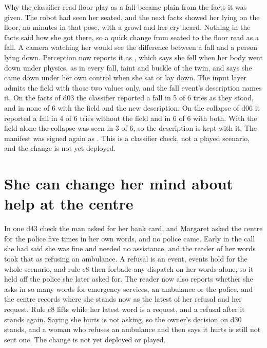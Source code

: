 Why the classifier read floor play as a fall became plain from the facts it was given.
The robot had seen her seated, and the next facts showed her lying on the floor, no minutes in that
pose, with a growl and her cry heard.
Nothing in the facts said how she got there, so a quick change from seated to the floor read as a
fall.
A camera watching her would see the difference between a fall and a person lying down.
Perception now reports it as , which says she fell when her body went down under
physics, as in every fall, faint and buckle of the twin, and says she came down under her own
control when she sat or lay down.
The input layer admits the field with those two values only, and the fall event's description
names it.
On the facts of d03 the classifier reported a fall in 5 of 6 tries as they stood, and in none of 6
with the field and the new description.
On the collapse of d06 it reported a fall in 4 of 6 tries without the field and in 6 of 6 with
both.
With the field alone the collapse was seen in 3 of 6, so the description is kept with it.
The manifest was signed again as .
This is a classifier check, not a played scenario, and the change is not yet deployed.

\section{She can change her mind about help at the centre}\label{sec:log-mind}

In one d43 check the man asked for her bank card, and Margaret asked the centre for the police
five times in her own words, and no police came.
Early in the call she had said she was fine and needed no assistance, and the reader of her words
took that as refusing an ambulance.
A refusal is an event, events hold for the whole scenario, and rule c8 then forbade any dispatch
on her words alone, so it held off the police she later asked for.
The reader now also reports whether she asks in so many words for emergency services, an ambulance
or the police, and the centre records where she stands now as the latest of her refusal and her
request.
Rule c8 lifts while her latest word is a request, and a refusal after it stands again.
Saying she hurts is not asking, so the owner's decision on d30 stands, and a woman who refuses an
ambulance and then says it hurts is still not sent one.
The change is not yet deployed or played.

